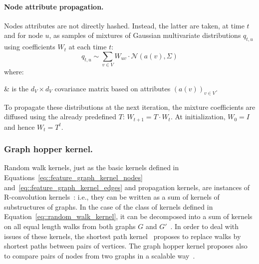             \paragraph{Node attribute propagation.}
            Nodes attributes are not directly hashed.
            Instead, the latter are taken, at time $t$ and for node $u$, as samples of mixtures of Gaussian multivariate distributions $q_{t, u}$ using coefficients $W_t$ at each time $t$:
            \begin{equation}
                \label{eq::attribute_samples}
                q_{t, u} \sim \sum_{v \in V} W_{uv}\cdot \mathscr{N}(a(v), \Sigma)
            \end{equation}
            where:
            \begin{conditions}
                \Sigma & is the $d_V \times d_V$ covariance matrix based on attributes $\left(a(v)\right)_{v\in V}$.
            \end{conditions}
            To propagate these distributions at the next iteration, the mixture coefficients are diffused using the already predefined $T$: $W_{t+1} = T\cdot W_t$.
            At initialization, $W_0 = I$ and hence $W_t= T^t$.

        \subsubsection{Graph hopper kernel.}
            Random walk kernels, just as the basic kernels defined in Equations~\ref{eq::feature_graph_kernel_nodes} and~\ref{eq::feature_graph_kernel_edges} and propagation kernels, are instances of R-convolution kernels~\parencite{haussler1999convolution}: i.e., they can be written as a sum of kernels of substructures of graphs.
            In the case of the class of kernels defined in Equation~\ref{eq::random_walk_kernel}, it can be decomposed into a sum of kernels on all equal length walks from both graphs \(G\) and \(G'\)~\parencite{vishwanathan2010graph}.
            In order to deal with issues of these kernels, the shortest path kernel~\parencite{borgwardt2005shortest} proposes to replace walks by shortest paths between pairs of vertices.
            The graph hopper kernel proposes also to compare pairs of nodes from two graphs in a scalable way~\parencite{feragen2013scalable}.
            

